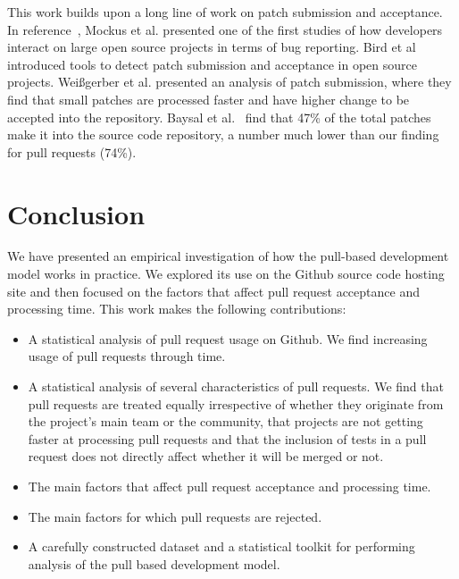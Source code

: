 \documentclass{sig-alternate}
\begin{document}
This work builds upon a long line of work on patch submission and acceptance.
In reference~\cite{MOCKU02}, Mockus et al. presented one of the first studies of
how developers interact on large open source projects in terms of bug reporting.
Bird et al~\cite{Bird07a} introduced tools to detect patch submission and
acceptance in open source projects. Wei\ss gerber et al. presented an analysis
of patch submission, where they find that small patches are processed faster and
have higher change to be accepted into the repository. Baysal et
al.~\cite{Baysa12} find that 47\% of the total patches make it into the source
code repository, a number much lower than our finding for pull requests (74\%).

\section{Conclusion}

We have presented an empirical investigation of how the pull-based development
model works in practice. We explored its use on the Github source code
hosting site and then focused on the factors that affect pull request acceptance
and processing time. This work makes the following contributions:

\begin{itemize}

  \item A statistical analysis of pull request usage on Github.
    We find increasing usage of pull requests through time.

  \item A statistical analysis of several characteristics of pull requests.  We
    find that pull requests are treated equally irrespective of whether they
    originate from the project's main team or the community, that projects are
    not getting faster at processing pull requests and that the inclusion of
    tests in a pull request does not directly affect whether it will be merged
    or not.

  \item The main factors that affect pull request acceptance and
    processing time.

  \item The main factors for which pull requests are rejected. 

  \item A carefully constructed dataset and a statistical toolkit for
    performing analysis of the pull based development model.

\end{itemize}
\end{document}
